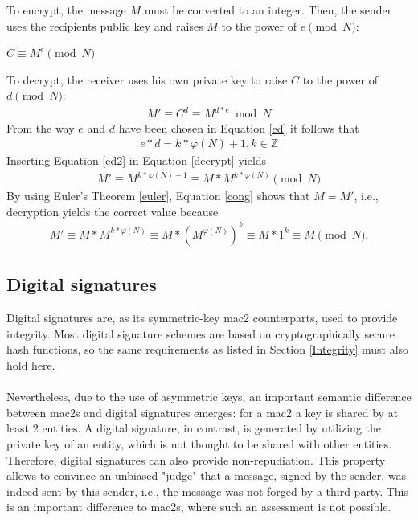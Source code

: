 To encrypt, the message $M$ must be converted to an integer. Then, the sender uses the recipients public key and raises $M$ to the power of $e \pmod N$:
\begin{center}
 $C \equiv M^e \pmod N$
\end{center}
To decrypt, the receiver uses his own private key to raise $C$ to the power of $d \pmod N$:
\begin{align}\label{decrypt}
 M' \equiv C^d \equiv M^{d*e} \bmod N
\end{align}
From the way $e$ and $d$ have been chosen in Equation \ref{ed} it follows that 
\begin{align}\label{ed2}
 e*d = k * \varphi(N) + 1, k \in \mathbb{Z} 
\end{align}
Inserting Equation \ref{ed2} in Equation \ref{decrypt} yields
\begin{align}\label{cong}
  M' \equiv M^{k * \varphi(N) + 1} \equiv M* M^{k * \varphi(N)} \pmod N
\end{align}
By using Euler's Theorem \ref{euler}, Equation \ref{cong} shows that $M=M'$, i.e., decryption yields the correct value because
\begin{align*}
 M' \equiv M* M^{k * \varphi(N)} \equiv M* (M^{ \varphi(N)})^k \equiv M * 1^k \equiv M \pmod N.
\end{align*} 

\subsection{Digital signatures}\label{digitalSignatures}

Digital signatures are, as its symmetric-key \gls{mac2} counterparts, used to provide integrity. Most digital signature schemes are based on
cryptographically secure hash functions, so the same requirements as listed in Section \ref{Integrity} must also hold here.
\\
\\
Nevertheless, due to the use of asymmetric keys, an important semantic difference between \glspl{mac2} and digital signatures emerges: for a \gls{mac2} 
a key is shared by at least 2 entities. A digital signature, in contrast, is generated by utilizing the private key of an entity, which is not thought to be shared with
other entities. Therefore, digital signatures can also provide non-repudiation.
This property allows to convince an unbiased "judge" that a message, signed by the sender, was indeed sent by this sender, i.e., the message was not
forged by a third party. This is an important difference to \glspl{mac2}, where such an assessment is not possible.

